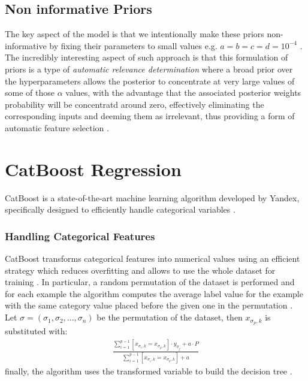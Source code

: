 \subsection{Non informative Priors}
The key aspect of the model is that we intentionally make these priors non-informative by fixing their parameters to small values e.g. $a = b = c = d = 10^{-4}$ \cite{tipping}. The incredibly interesting aspect of such approach is that this formulation of priors is a type of \textit{automatic relevance determination} \cite{MacKay1996} where a broad prior over the hyperparameters allows the posterior to concentrate at very large values of some of those $\alpha$ values, with the advantage that the associated posterior weights probability will be concentratd around zero, effectively eliminating the corresponding inputs and deeming them as irrelevant, thus providing a form of automatic feature selection \cite{tipping}. 


\section{CatBoost Regression}

CatBoost is a state-of-the-art machine learning algorithm developed by Yandex, specifically designed to efficiently handle categorical variables \cite{prokhorenkova2018catboost}.

\subsubsection{Handling Categorical Features}

CatBoost transforms categorical features into numerical values using an efficient strategy which reduces overfitting and allows to use the whole dataset for training \cite{dorogush2018catboost}. In particular, a random permutation of the dataset is performed and for each example the algorithm computes the average label value for the example with the same category value placed before the given one in the permutation \cite{dorogush2018catboost}. Let $\sigma = (\sigma_1, \sigma_2, ..., \sigma_n)$ be the permutation of the dataset, then $x_{\sigma_p, k}$ is substituted with:
\begin{align}
    \frac{\sum_{i=1}^{p-1} [x_{\sigma_i, k} = x_{\sigma_p, k}] \cdot y_{\sigma_j} + a \cdot P }{\sum_{i=1}^{p-1} [x_{\sigma_i, k} = x_{\sigma_p, k}] + a}
\end{align}
\noindent finally, the algorithm uses the transformed variable to build the decision tree \cite{dorogush2018catboost}.

